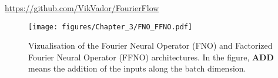 \begin{center}
\href{https://github.com/VikVador/FourierFlow}{https://github.com/VikVador/FourierFlow}
\end{center}


\newpage

\begin{figure}[H]
	\vspace{-2em}
    \centering
    \texttt{[image: figures/Chapter\_3/FNO\_FFNO.pdf]}
    \caption{Vizualisation of the Fourier Neural Operator (FNO) and Factorized Fourier Neural Operator (FFNO) architectures. In the figure, \textbf{ADD} means the addition of the inputs along the batch dimension.}
    \label{C3 - FIG - Vizualisation FNO and FFNO}
\end{figure}

\newpage

%







